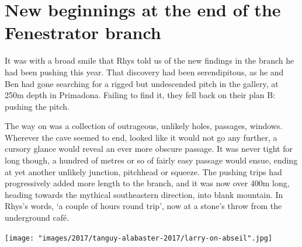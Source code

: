 \section{New beginnings at the end of the Fenestrator branch}

\begin{marginfigure}
\end{marginfigure}


It was with a broad smile that Rhys told us of the new findings in the  branch he had been pushing this year. That discovery had been serendipitous, as he and Ben had gone searching for a rigged but undescended pitch in the  gallery, at 250m depth in \passage[cave]Primadona. Failing to find it, they fell back on their plan B: pushing the  pitch.

The way on was a collection of  outrageous, unlikely holes, passages, windows. Wherever the cave seemed to end, looked like it would not go any further, a cursory glance would reveal an ever more obscure passage. It was never tight for long though, a hundred of metres or so of fairly easy passage would ensue, ending at yet another unlikely junction, pitchhead or squeeze. The pushing trips had progressively added more length to the branch, and it was now over 400m long, heading towards the mythical southeastern direction, into blank mountain. In Rhys's words, `a couple of hours round trip', now at a stone's throw from the underground café. 

\begin{marginfigure} \centering \vspace{-115pt}
\texttt{[image: "images/2017/tanguy-alabaster-2017/larry-on-abseil".jpg]}
\caption{Larry Jiang on the Primadona abseil, a kilometer above the \protect{} valley--- Rhys Tyers}
\end{marginfigure}

